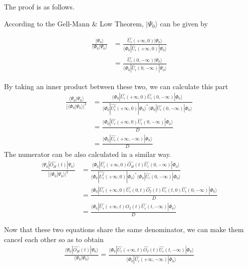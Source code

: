 ﻿\documentclass[twoside]{book}
\numberwithin{equation}{section}
\begin{document}
The proof is as follows.

According to the Gell-Mann \& Low Theorem, $|\Psi_0\rangle$ can be given by

\begin{align}
\frac{|\Psi_0\rangle}{\langle\Phi_0|\Psi_0\rangle}&=\frac{\hat{U_{\epsilon}}(+\infty,0)|\Psi_0\rangle}{\langle\Phi_0|\hat U_{\epsilon}(+\infty,0)|\Psi_0\rangle} \nonumber \\
&=\frac{\hat{U_{\epsilon}}(0,-\infty)|\Psi_0\rangle}{\langle\Phi_0|\hat U_{\epsilon}(0,-\infty)|\Psi_0\rangle} \nonumber
\end{align}

By taking an inner product between these two, we can calculate this part
\begin{align}
\frac{\langle\Psi_0|\Psi_0\rangle}{|\langle\Phi_0|\Psi_0\rangle|^2}&=\frac{\langle\Phi_0|\hat{U_{\epsilon}}(+\infty,0)\hat{U_{\epsilon}}(0,-\infty)|\Phi_0\rangle}{\langle\Phi_0|\hat{U^{\dagger}_{\epsilon}}(+\infty,0)|\Phi_0\rangle^*\langle\Phi_0|\hat{U_{\epsilon}}(0,-\infty)|\Phi_0\rangle} \nonumber \\
&=\frac{\langle\Phi_0|\hat{U_{\epsilon}}(+\infty,0)\hat{U_{\epsilon}}(0,-\infty)|\Phi_0\rangle}{D} \nonumber \\
&= \frac{\langle\Phi_0|\hat{U_{\epsilon}}(+\infty,-\infty)|\Phi_0\rangle}{D} \nonumber
\end{align}
The numerator can be also calculated in a similar way.
\begin{align}
\frac{\langle\Psi_0|\hat{O_H}(t)|\Psi_0\rangle}{|\langle\Phi_0|\Psi_0\rangle|^2}&=\frac{\langle\Phi_0|\hat{U_{\epsilon}}(+\infty,0)\hat{O_H}(t)\hat{U_{\epsilon}}(0,-\infty)|\Phi_0\rangle}{\langle\Phi_0|\hat{U^{\dagger}_{\epsilon}}(+\infty,0)|\Phi_0\rangle^*\langle\Phi_0|\hat{U_{\epsilon}}(0,-\infty)|\Phi_0\rangle} \nonumber \\
&=\frac{\langle\Phi_0|\hat{U_{\epsilon}}(+\infty,0)\hat{U_{\epsilon}}(0,t)\hat{O_I}(t)\hat{U_{\epsilon}}(t,0)\hat{U_{\epsilon}}(0,-\infty)|\Phi_0\rangle}{D} \nonumber \\
&=\frac{\langle\Phi_0|\hat{U_{\epsilon}}(+\infty,t)\hat{O_I}(t)\hat{U_{\epsilon}}(t,-\infty)|\Phi_0\rangle}{D} \nonumber
\end{align}


Now that these two equations share the same denominator, we can make them cancel each other so as to obtain
\begin{align}
\frac{\langle\Psi_0|\hat{O_H}(t)|\Psi_0\rangle}{\langle\Psi_0|\Psi_0\rangle}=\frac{\langle\Phi_0|\hat{U_{\epsilon}}(+\infty,t)\hat{O_I}(t)\hat{U_{\epsilon}}(t,-\infty)|\Phi_0\rangle}{\langle\Phi_0|\hat{U_{\epsilon}}(+\infty,-\infty)|\Phi_0\rangle}\nonumber
\end{align}
\end{document}
